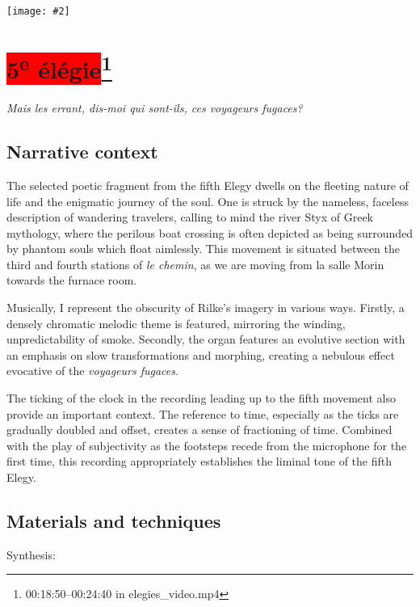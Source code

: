 \documentclass[12pt,twoside,maitrise]{dms_ks}
\newcommand{\customincludeexamples}[4][]{%
    \begin{example}[H]
        \centering
        \texttt{[image: \#2]}
        \caption{#4}
	\label{#3} 
    \end{example}
}
\theoremstyle{definition}
\begin{document}
{{\customincludeexamples[width=\textwidth]{4e_6}{ex:4e_6}{The poetic fragment set over held pedal tones and a recording of \textit{la salle Morin} (p.~12 sys.~1).}

\section{\colorbox{red}{5\textsuperscript{e} élégie}\footnote{00:18:50--00:24:40 in elegies\_video.mp4}}

\epigraph{\textit{Mais les errant, dis-moi qui sont-ils, ces voyageurs fugaces?}}{}

\subsection{Narrative context}

The selected poetic fragment from the fifth Elegy dwells on the fleeting nature of life and the enigmatic journey of the soul. 
One is struck by the nameless, faceless description of wandering travelers, calling to mind the river Styx of Greek mythology, where the perilous boat crossing is often depicted as being surrounded by phantom souls which float aimlessly. 
This movement is situated between the third and fourth stations of \textit{le chemin}, as we are moving from la salle Morin towards the furnace room. 

Musically, I represent the obscurity of Rilke's imagery in various ways. 
Firstly, a densely chromatic melodic theme is featured, mirroring the winding, unpredictability of smoke. 
Secondly, the organ features an evolutive section with an emphasis on slow transformations and morphing, creating a nebulous effect evocative of the \textit{voyageurs fugaces}. 

The ticking of the clock in the recording leading up to the fifth movement also provide an important context. 
The reference to time, especially as the ticks are gradually doubled and offset, creates a sense of fractioning of time. 
Combined with the play of subjectivity as the footsteps recede from the microphone for the first time, this recording appropriately establishes the liminal tone of the fifth Elegy.

\subsection{Materials and techniques}

Synthesis:

}}
\end{document}
